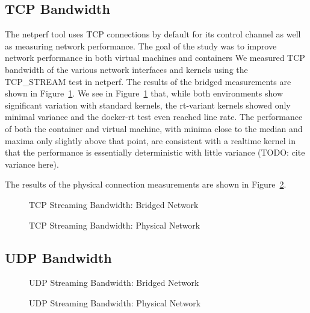 \subsection{TCP Bandwidth} %
\label{sub:tcpbandwidth}
The netperf tool uses TCP connections by default for its control channel as well as measuring network performance. 
    The goal of the study was to improve network performance in both virtual machines and containers 
We measured TCP bandwidth of the various network interfaces and kernels using the TCP\_STREAM test in netperf.
The results of the bridged measurements are shown in Figure~\ref{fig:tcp_stream_bridge}.
We see in Figure~\ref{fig:tcp_stream_bridge} that, while both environments show significant variation with standard kernels, the rt-variant kernels showed only minimal variance and the docker-rt test even reached line rate.  
The performance of both the container and virtual machine, with minima close to the median and maxima only slightly above that point, are consistent with a realtime kernel in that the performance is essentially deterministic with little variance (TODO: cite variance here).

The results of the physical connection measurements are shown in Figure~\ref{fig:tcp_stream_phys}.
\begin{figure}
    \centering
    \def\svgwidth{\columnwidth}
    
    \caption{TCP Streaming Bandwidth: Bridged Network}
    \label{fig:tcp_stream_bridge}
\end{figure}
\begin{figure}
    \centering
    \def\svgwidth{\columnwidth}
    
    \caption{TCP Streaming Bandwidth: Physical Network}
    \label{fig:tcp_stream_phys}
\end{figure}

\subsection{UDP Bandwidth} %
\label{sub:udpbandwidth}
\begin{figure}
    \centering
    \def\svgwidth{\columnwidth}
    
    \caption{UDP Streaming Bandwidth: Bridged Network}
    \label{fig:udp_stream_bridge}
\end{figure}
\begin{figure}
    \centering
    \def\svgwidth{\columnwidth}
    
    \caption{UDP Streaming Bandwidth: Physical Network}
    \label{fig:udp_stream_phys}
\end{figure}


